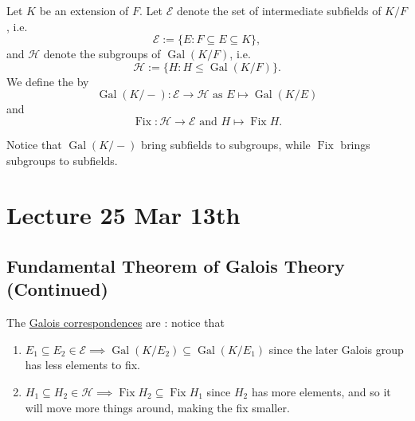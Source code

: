 \documentclass[notoc,notitlepage,nobib]{tufte-book}
\DeclareMathOperator{\Gal}{Gal}
\DeclareMathOperator{\Fix}{Fix}
\begin{document}
\begin{defn}\label{defn:galois_correspondences}
  Let $K$ be an extension of $F$. Let $\mathcal{E}$ denote the set of
  intermediate subfields of $K / F$, i.e.
  \begin{equation*}
    \mathcal{E} := \{ E : F \subseteq E \subseteq K \},
  \end{equation*}
  and $\mathcal{H}$ denote the subgroups of $\Gal(K / F)$, i.e.
  \begin{equation*}
    \mathcal{H} := \{ H : H \leq \Gal(K / F) \}.
  \end{equation*}
  We define the  by
  \begin{equation*}
    \Gal(K / -) : \mathcal{E} \to \mathcal{H} \text{ as } E \mapsto \Gal(K / E)
  \end{equation*}
  and
  \begin{equation*}
    \Fix : \mathcal{H} \to \mathcal{E} \text{ and } H \mapsto \Fix H.
  \end{equation*}
\end{defn}

\begin{note}
  Notice that $\Gal(K / -)$ bring subfields to subgroups, while $\Fix$ brings
  subgroups to subfields.
\end{note}



\chapter{Lecture 25 Mar 13th}%
\label{chp:lecture_25_mar_13th}

\section{Fundamental Theorem of Galois Theory (Continued)}%
\label{sec:fundamental_theorem_of_galois_theory_continued}

\begin{remark}
  The \hyperref[defn:galois_correspondences]{Galois correspondences} are
  : notice that
  \begin{enumerate}
    \item $E_1 \subseteq E_2 \in \mathcal{E} \implies \Gal(K / E_2) \subseteq \Gal(K
      / E_1)$ since the later Galois group has less elements to fix.
    \item $H_1 \subseteq H_2 \in \mathcal{H} \implies \Fix H_2 \subseteq \Fix
      H_1$ since $H_2$ has more elements, and so it will move more things
      around, making the fix smaller.
  \end{enumerate}
\end{remark}
\end{document}
